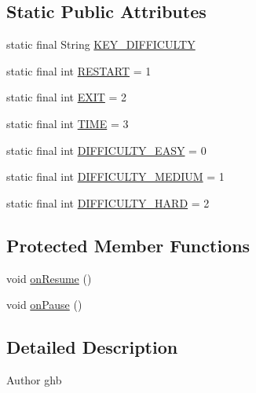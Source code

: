 \subsection*{Static Public Attributes}
\begin{DoxyCompactItemize}
\item 
static final String \mbox{\hyperlink{class_island__and___bridges_1_1_hashi_1_1_hashi_game_a62695474a443df3080f366dfddababaf}{K\+E\+Y\+\_\+\+D\+I\+F\+F\+I\+C\+U\+L\+TY}}
\item 
static final int \mbox{\hyperlink{class_island__and___bridges_1_1_hashi_1_1_hashi_game_a8af0e6f5631c9ee748f725560af2c2d8}{R\+E\+S\+T\+A\+RT}} = 1
\item 
static final int \mbox{\hyperlink{class_island__and___bridges_1_1_hashi_1_1_hashi_game_af0b1161d62f3b70ff51d2d7d56f9cdd5}{E\+X\+IT}} = 2
\item 
static final int \mbox{\hyperlink{class_island__and___bridges_1_1_hashi_1_1_hashi_game_a8526419d02076359acc741734dd5ad51}{T\+I\+ME}} = 3
\item 
static final int \mbox{\hyperlink{class_island__and___bridges_1_1_hashi_1_1_hashi_game_a9a533557c0399af0e7ac18853eac7118}{D\+I\+F\+F\+I\+C\+U\+L\+T\+Y\+\_\+\+E\+A\+SY}} = 0
\item 
static final int \mbox{\hyperlink{class_island__and___bridges_1_1_hashi_1_1_hashi_game_af2b199f2b91030489c454905d86fa1dd}{D\+I\+F\+F\+I\+C\+U\+L\+T\+Y\+\_\+\+M\+E\+D\+I\+UM}} = 1
\item 
static final int \mbox{\hyperlink{class_island__and___bridges_1_1_hashi_1_1_hashi_game_ab03d9a4711d6d534c72b5cae77e21c33}{D\+I\+F\+F\+I\+C\+U\+L\+T\+Y\+\_\+\+H\+A\+RD}} = 2
\end{DoxyCompactItemize}
\subsection*{Protected Member Functions}
\begin{DoxyCompactItemize}
\item 
void \mbox{\hyperlink{class_island__and___bridges_1_1_hashi_1_1_hashi_game_afb186cfbed18e354dd4c3f4b51759bf1}{on\+Resume}} ()
\item 
void \mbox{\hyperlink{class_island__and___bridges_1_1_hashi_1_1_hashi_game_ab781dd4fdf31bd6254b59d869a75bb0e}{on\+Pause}} ()
\end{DoxyCompactItemize}


\subsection{Detailed Description}
\begin{DoxyAuthor}{Author}
ghb 
\end{DoxyAuthor}


